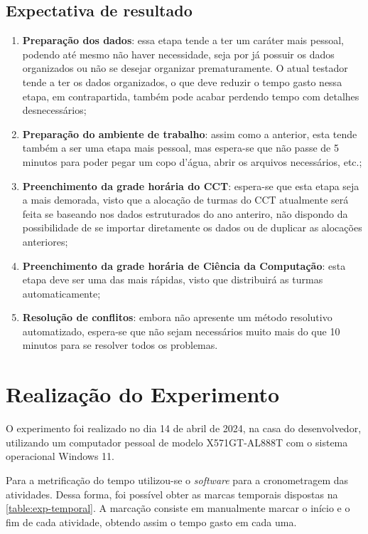 \subsection{Expectativa de resultado}

\begin{enumerate}
  \item \textbf{Preparação dos dados}: essa etapa tende a ter um caráter mais pessoal, podendo até mesmo não haver necessidade, seja por já possuir os dados organizados ou não se desejar organizar prematuramente. O atual testador tende a ter os dados organizados, o que deve reduzir o tempo gasto nessa etapa, em contrapartida, também pode acabar perdendo tempo com detalhes desnecessários;
  \item \textbf{Preparação do ambiente de trabalho}: assim como a anterior, esta tende também a ser uma etapa mais pessoal, mas espera-se que não passe de 5 minutos para poder pegar um copo d'água, abrir os arquivos necessários, etc.;
  \item \textbf{Preenchimento da grade horária do CCT}: espera-se que esta etapa seja a mais demorada, visto que a alocação de turmas do CCT atualmente será feita se baseando nos dados estruturados do ano anteriro, não dispondo da possibilidade de se importar diretamente os dados ou de duplicar as alocações anteriores;
  \item \textbf{Preenchimento da grade horária de Ciência da Computação}: esta etapa deve ser uma das mais rápidas, visto que distribuirá as turmas automaticamente;
  \item \textbf{Resolução de conflitos}: embora não apresente um método resolutivo automatizado, espera-se que não sejam necessários muito mais do que 10 minutos para se resolver todos os problemas.
\end{enumerate}

\section{Realização do Experimento}

O experimento foi realizado no dia 14 de abril de 2024, na casa do desenvolvedor, utilizando um computador pessoal de modelo X571GT-AL888T com o sistema operacional Windows 11.

Para a metrificação do tempo utilizou-se o \textit{software}  para a cronometragem das atividades. Dessa forma, foi possível obter as marcas temporais dispostas na \autoref{table:exp-temporal}. A marcação consiste em manualmente marcar o início e o fim de cada atividade, obtendo assim o tempo gasto em cada uma.

